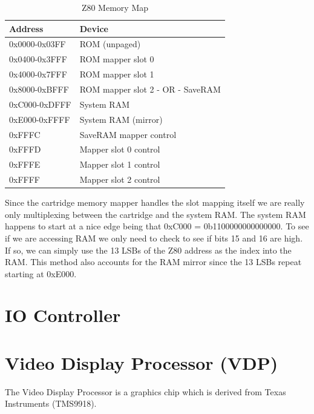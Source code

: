 \documentclass{article}
\begin{document}
\begin{table}[H]
    \centering
    \selectfont
    \begin{tabular}{l|l}
        Address     & Device                           \\
        \hline
        \hline
        0x0000-0x03FF & ROM (unpaged)                    \\
        0x0400-0x3FFF & ROM mapper slot 0                \\
        0x4000-0x7FFF & ROM mapper slot 1                \\
        0x8000-0xBFFF & ROM mapper slot 2 - OR - SaveRAM \\
        0xC000-0xDFFF & System RAM                       \\
        0xE000-0xFFFF & System RAM (mirror)              \\
        0xFFFC       & SaveRAM mapper control           \\
        0xFFFD       & Mapper slot 0 control            \\
        0xFFFE       & Mapper slot 1 control            \\
        0xFFFF       & Mapper slot 2 control            \\
    \end{tabular}
    \fontfamily{}\selectfont
    \caption{Z80 Memory Map \protect\cite{mem_map_table}}
\end{table}

Since the cartridge memory mapper handles the slot mapping itself we are really
only multiplexing between the cartridge and the system RAM.  The system RAM
happens to start at a nice edge being that 0xC000 = 0b1100000000000000. To see
if we are accessing RAM we only need to check to see if bits 15 and 16 are
high. If so, we can simply use the 13 LSBs of the Z80 address as the index into
the RAM.  This method also accounts for the RAM mirror since the 13 LSBs repeat
starting at 0xE000.

\section{IO Controller}
\section{Video Display Processor (VDP)}

The Video Display Processor is a graphics chip which is derived from Texas
Instruments (TMS9918). 
\end{document}
